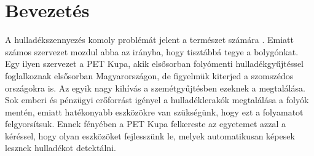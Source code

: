 \chapter{Bevezetés}
\label{ch:intro}

A hulladékszennyezés komoly problémát jelent a természet számára \cite{kibria2023PlasticWaste}. Emiatt számos szervezet mozdul abba az irányba, hogy tisztábbá tegye a bolygónkat. Egy ilyen szervezet a PET Kupa, akik elsősorban folyómenti hulladékgyűjtéssel foglalkoznak elsősorban Magyarországon, de figyelmük kiterjed a szomszédos országokra is. Az egyik nagy kihívás a szemétgyűjtésben ezeknek a megtalálása. Sok emberi és pénzügyi erőforrást igényel a hulladéklerakók megtalálása a folyók mentén, emiatt hatékonyabb eszközökre van szükségünk, hogy ezt a folyamatot felgyorsítsuk. Ennek fényében a PET Kupa felkereste az egyetemet azzal a kéréssel, hogy olyan eszközöket fejlesszünk le, melyek automatikusan képesek lesznek hulladékot detektálni.
